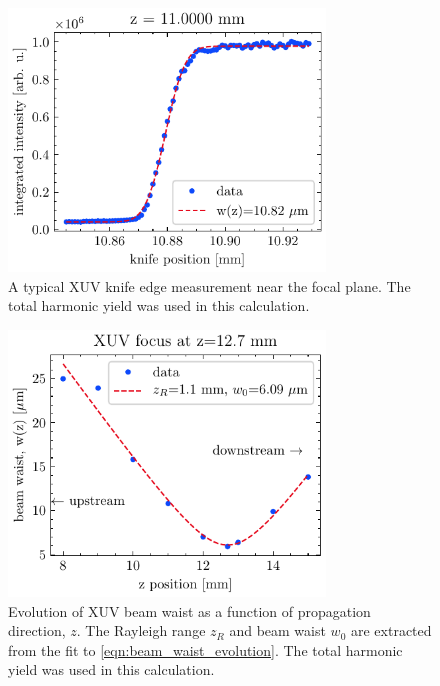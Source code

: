\begin{figure}
	\centering
	\includegraphics[width=0.75\textwidth]{figures/chap3/XUV_focus_knife_edge.pdf}
	\caption{A typical XUV knife edge measurement near the focal plane. The total harmonic yield was used in this calculation.}
	\label{fig:XUV_focus_knife_edge}
\end{figure}

\begin{figure}
	\centering
	\includegraphics[width=0.75\textwidth]{figures/chap3/XUV_waist_vs_k.pdf}
	\caption{Evolution of XUV beam waist as a function of propagation direction, $z$. The Rayleigh range $z_R$ and beam waist $w_0$ are extracted from the fit to \cref{eqn:beam_waist_evolution}. The total harmonic yield was used in this calculation.}
	\label{fig:XUV_waist_vs_k}
\end{figure}

